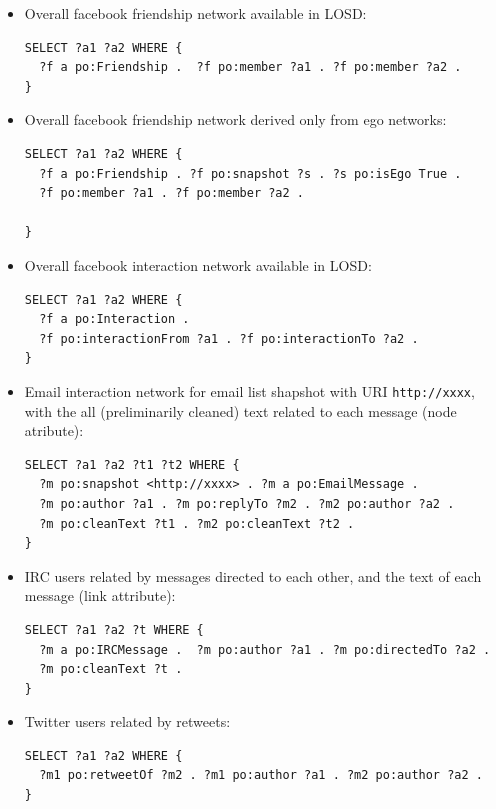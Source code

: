 \documentclass[review]{elsarticle}
\begin{document}
\begin{itemize}
  \item Overall facebook friendship network available in LOSD:
\begin{lstlisting}[language=spq]
SELECT ?a1 ?a2 WHERE { 
  ?f a po:Friendship .  ?f po:member ?a1 . ?f po:member ?a2 .
}
\end{lstlisting}\vspace{-0.2cm}
  \item Overall facebook friendship network derived only from ego networks:
\begin{lstlisting}[language=spq]
SELECT ?a1 ?a2 WHERE { 
  ?f a po:Friendship . ?f po:snapshot ?s . ?s po:isEgo True .
  ?f po:member ?a1 . ?f po:member ?a2 .

}
\end{lstlisting}\vspace{-0.2cm}
  \item Overall facebook interaction network available in LOSD:
\begin{lstlisting}[language=spq]
SELECT ?a1 ?a2 WHERE { 
  ?f a po:Interaction .
  ?f po:interactionFrom ?a1 . ?f po:interactionTo ?a2 .
}
\end{lstlisting}\vspace{-0.2cm}
  \item Email interaction network for email list shapshot with URI \verb|http://xxxx|, with the all (preliminarily cleaned) text related to each message (node atribute):
\begin{lstlisting}[language=spq]
SELECT ?a1 ?a2 ?t1 ?t2 WHERE { 
  ?m po:snapshot <http://xxxx> . ?m a po:EmailMessage .
  ?m po:author ?a1 . ?m po:replyTo ?m2 . ?m2 po:author ?a2 .
  ?m po:cleanText ?t1 . ?m2 po:cleanText ?t2 .
}
\end{lstlisting}\vspace{-0.2cm}
  \item IRC users related by messages directed to each other, and the text of each message (link attribute):
\begin{lstlisting}[language=spq]
SELECT ?a1 ?a2 ?t WHERE { 
  ?m a po:IRCMessage .  ?m po:author ?a1 . ?m po:directedTo ?a2 .
  ?m po:cleanText ?t .
}
\end{lstlisting}\vspace{-0.2cm}
  \item Twitter users related by retweets:
\begin{lstlisting}[language=spq]
SELECT ?a1 ?a2 WHERE { 
  ?m1 po:retweetOf ?m2 . ?m1 po:author ?a1 . ?m2 po:author ?a2 .
}
\end{lstlisting}\vspace{-0.2cm}

\end{itemize}
\end{document}
